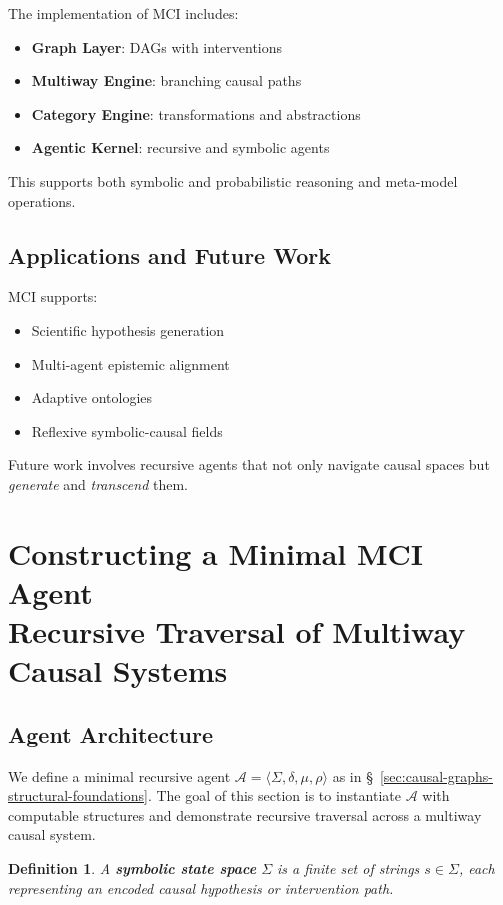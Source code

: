 \documentclass[10pt]{article}
\newtheorem{definition}{Definition}
\begin{document}
The implementation of MCI includes:
\begin{itemize}
    \item \textbf{Graph Layer}: DAGs with interventions
    \item \textbf{Multiway Engine}: branching causal paths
    \item \textbf{Category Engine}: transformations and abstractions
    \item \textbf{Agentic Kernel}: recursive and symbolic agents
\end{itemize}

This supports both symbolic and probabilistic reasoning and meta-model
operations.

\subsection{Applications and Future Work}

MCI supports:
\begin{itemize}
    \item Scientific hypothesis generation
    \item Multi-agent epistemic alignment
    \item Adaptive ontologies
    \item Reflexive symbolic-causal fields
\end{itemize}

Future work involves recursive agents that not only navigate causal spaces but
\textit{generate} and \textit{transcend} them.


\section{\textbf{Constructing a Minimal MCI Agent}\\\large Recursive Traversal of Multiway Causal Systems}


\subsection{Agent Architecture}

We define a minimal recursive agent \( \mathcal{A} = \langle \Sigma, \delta,
\mu, \rho \rangle \) as in
\S~\ref{sec:causal-graphs-structural-foundations}. The goal of this
section is to instantiate \( \mathcal{A} \) with computable structures and
demonstrate recursive traversal across a multiway causal system.

\begin{definition}

A \textbf{symbolic state space} \( \Sigma \) is a finite set of strings \( s
\in \Sigma \), each representing an encoded causal hypothesis or intervention
path.

\end{definition}
\end{document}
